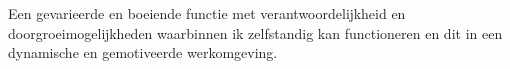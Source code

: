 

Een gevarieerde en boeiende functie met verantwoordelĳkheid en doorgroeimogelĳkheden
waarbinnen ik zelfstandig kan functioneren en dit in een dynamische en gemotiveerde
werkomgeving.

